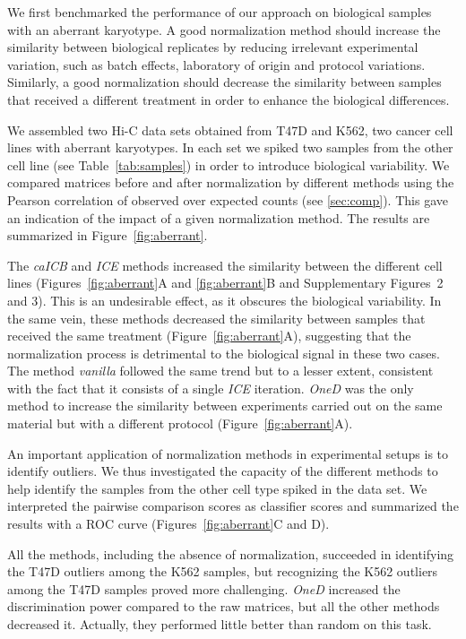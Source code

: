 \documentclass{bioinfo}
\begin{document}
We first benchmarked the performance of our approach on biological
samples with an aberrant karyotype. A good normalization method should
increase the similarity between biological replicates by reducing
irrelevant experimental variation, such as batch effects, laboratory of
origin and protocol variations. Similarly, a good normalization should
decrease the similarity between samples that received a different
treatment in order to enhance the biological differences.

We assembled two Hi-C data sets obtained from T47D and K562, two cancer
cell lines with aberrant karyotypes. In each set we spiked two samples
from the other cell line (see Table~\ref{tab:samples}) in order to
introduce biological variability. We compared matrices before and after
normalization by different methods using the Pearson correlation of
observed over expected counts (see \ref{sec:comp}). This gave an
indication of the impact of a given normalization method. The results are
summarized in Figure~\ref{fig:aberrant}.

The \textit{caICB} and \textit{ICE} methods increased the similarity
between the different cell lines (Figures~\ref{fig:aberrant}A and
\ref{fig:aberrant}B and Supplementary Figures~2 and 3). This is an undesirable
effect, as it obscures the biological variability. In the same vein, these
methods decreased the similarity between samples that received the same
treatment (Figure~\ref{fig:aberrant}A), suggesting that the normalization
process is detrimental to the biological signal in these two cases. The
method \textit{vanilla} followed the same trend but to a lesser extent,
consistent with the fact that it consists of a single \textit{ICE}
iteration. \textit{OneD} was the only method to increase the similarity
between experiments carried out on the same material but with a different
protocol (Figure~\ref{fig:aberrant}A).

An important application of normalization methods in experimental setups
is to identify outliers. We thus investigated the capacity of the
different methods to help identify the samples from the other cell type
spiked in the data set. We interpreted the pairwise comparison scores as
classifier scores and summarized the results with a ROC curve
(Figures~\ref{fig:aberrant}C and D).

All the methods, including the absence of normalization, succeeded in
identifying the T47D outliers among the K562 samples, but recognizing the
K562 outliers among the T47D samples proved more challenging.
\textit{OneD} increased the discrimination power compared to the raw
matrices, but all the other methods decreased it. Actually, they performed
little better than random on this task.
\end{document}
